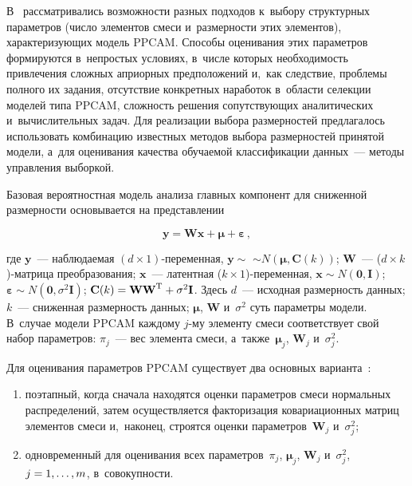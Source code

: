 \begin{multicols}{2}
     В~\cite{4-kri} рассматривались возможности разных подходов к~выбору 
структурных параметров (чис\-ло элементов смеси и~размерности этих 
элементов), характеризующих модель PPCAM. Способы \mbox{оценивания} этих 
параметров формируются в~непростых условиях, в~чис\-ле которых 
необходимость привлечения сложных априорных предположений и,~как 
следствие, проб\-ле\-мы полного их задания, отсутствие конкретных наработок 
в~области селекции моделей типа PPCAM, сложность решения сопутствующих 
аналитических и~вычислительных задач. Для реализации выбора размерностей 
предлагалось использовать комбинацию известных методов выбора 
размерностей принятой модели, а~для оценивания качества обучаемой 
классификации данных~--- методы управления выборкой. 
     
     Базовая вероятностная модель анализа главных компонент для 
сниженной размерности основывается на представлении

\vspace*{2pt}

\noindent
     $$
     \mathbf{y}=\mathbf{Wx}+\boldsymbol{\mu} +\boldsymbol{\varepsilon}\,,
     $$
     
     \vspace*{-4pt}
     
     \noindent
где $\mathbf{y}$~--- наблюдаемая $(d\times1)$-пе\-ре\-мен\-ная, $\mathbf{y}\sim$\linebreak
$\sim 
N(\boldsymbol{\mu}, \mathbf{C}(k))$; $\mathbf{W}$~--- ($d\times k$)-мат\-ри\-ца 
преобразования; $\mathbf{x}$~--- латентная ($k\times 1$)-пе\-ре\-мен\-ная, 
$\mathbf{x}\sim N(\mathbf{0}, \mathbf{I})$; $\boldsymbol{\varepsilon}\sim 
N(\mathbf{0},\sigma^2\mathbf{I})$; $\mathbf{C}(k)=\mathbf{WW}^{\mathrm{T}}\hm+ 
\sigma^2\mathbf{I}$. Здесь $d$~--- исходная размерность данных; $k$~--- 
сниженная размерность данных; $\boldsymbol{\mu}$, $\mathbf{W}$ 
и~$\sigma^2$ суть параметры модели. В~случае модели PPCAM каждому  
$j$-му элементу смеси соответствует свой набор па\-ра\-мет\-ров: $\pi_j$~--- вес 
элемента смеси, а~также~$\boldsymbol{\mu}_j$, $\mathbf{W}_j$ и~$\sigma_j^2$.

     Для оценивания параметров PPCAM существует два 
основных варианта~\cite{5-kri}: 
     \begin{enumerate}[(1)]
\item поэтапный, когда сначала находятся оценки параметров смеси 
нормальных распре\-де\-лений, затем осуществляется факторизация 
ковариационных матриц элементов смеси и,~наконец, строятся оценки 
параметров~$\mathbf{W}_j$ и~$\sigma_j^2$;
\item одновременный для оценивания всех па\-ра\-мет\-ров~$\pi_j$, 
$\boldsymbol{\mu}_j$, $\mathbf{W}_j$ и~$\sigma_j^2$, $j\hm= 1,\ldots , m$, 
в~со\-во\-куп\-ности.
\end{enumerate}
     

\end{multicols}
